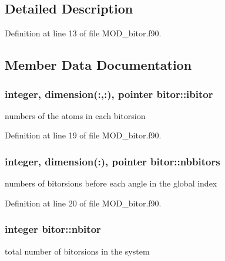 \subsection{Detailed Description}


Definition at line 13 of file M\-O\-D\-\_\-bitor.\-f90.



\subsection{Member Data Documentation}
\hypertarget{classbitor_a913b230eb13fc4829d92479745b98a2a}{
\subsubsection[{ibitor}]{\setlength{\rightskip}{0pt plus 5cm}integer, dimension(\-:,\-:), pointer bitor\-::ibitor}}\label{classbitor_a913b230eb13fc4829d92479745b98a2a}


numbers of the atoms in each bitorsion 



Definition at line 19 of file M\-O\-D\-\_\-bitor.\-f90.

\hypertarget{classbitor_aa20a049145348af5fbb86813dfdf9c6b}{
\subsubsection[{nbbitors}]{\setlength{\rightskip}{0pt plus 5cm}integer, dimension(\-:), pointer bitor\-::nbbitors}}\label{classbitor_aa20a049145348af5fbb86813dfdf9c6b}


numbers of bitorsions before each angle in the global index 



Definition at line 20 of file M\-O\-D\-\_\-bitor.\-f90.

\hypertarget{classbitor_af623cebc20e2041963d4656c8f08d008}{
\subsubsection[{nbitor}]{\setlength{\rightskip}{0pt plus 5cm}integer bitor\-::nbitor}}\label{classbitor_af623cebc20e2041963d4656c8f08d008}


total number of bitorsions in the system 



